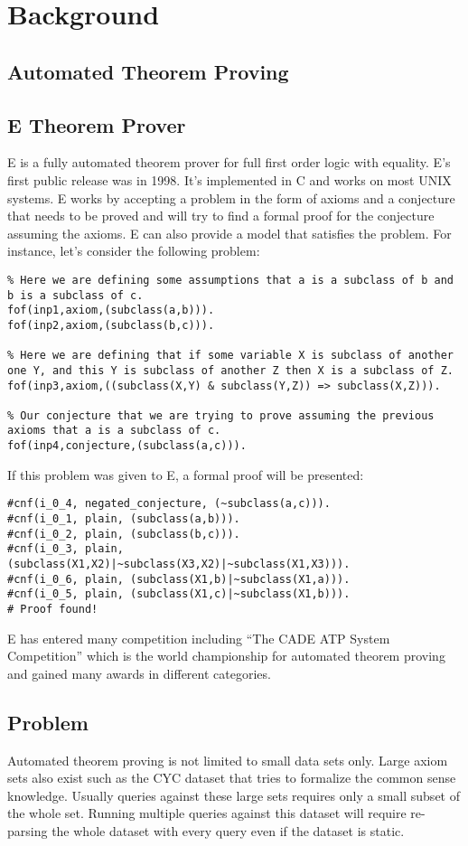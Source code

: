 \chapter{Background}\label{chap:background}

\section{Automated Theorem Proving}
\section{E Theorem Prover}
E is a fully automated theorem prover for full first order logic with equality. E's first public release was in 1998. It's implemented in C and works on most UNIX systems. E works by accepting a problem in the form of axioms and a conjecture that needs to be proved and will try to find a formal proof for the conjecture assuming the axioms. E can also provide a model that satisfies the problem. For instance, let's consider the following problem:
\begin{lstlisting}
% Here we are defining some assumptions that a is a subclass of b and b is a subclass of c.
fof(inp1,axiom,(subclass(a,b))).
fof(inp2,axiom,(subclass(b,c))).

% Here we are defining that if some variable X is subclass of another one Y, and this Y is subclass of another Z then X is a subclass of Z.
fof(inp3,axiom,((subclass(X,Y) & subclass(Y,Z)) => subclass(X,Z))).

% Our conjecture that we are trying to prove assuming the previous axioms that a is a subclass of c.
fof(inp4,conjecture,(subclass(a,c))).
\end{lstlisting}
If this problem was given to E, a formal proof will be presented:
\begin{lstlisting}
#cnf(i_0_4, negated_conjecture, (~subclass(a,c))).
#cnf(i_0_1, plain, (subclass(a,b))).
#cnf(i_0_2, plain, (subclass(b,c))).
#cnf(i_0_3, plain, (subclass(X1,X2)|~subclass(X3,X2)|~subclass(X1,X3))).
#cnf(i_0_6, plain, (subclass(X1,b)|~subclass(X1,a))).
#cnf(i_0_5, plain, (subclass(X1,c)|~subclass(X1,b))).
# Proof found!
\end{lstlisting}
E has entered many competition including ``The CADE ATP System Competition'' which is the world championship for automated theorem proving and gained many awards in different categories.

\section{Problem}
Automated theorem proving is not limited to small data sets only. Large axiom sets also exist such as the CYC dataset that tries to formalize the common sense knowledge. Usually queries against these large sets requires only a small subset of the whole set. Running multiple queries against this dataset will require re-parsing the whole dataset with every query even if the dataset is static.
